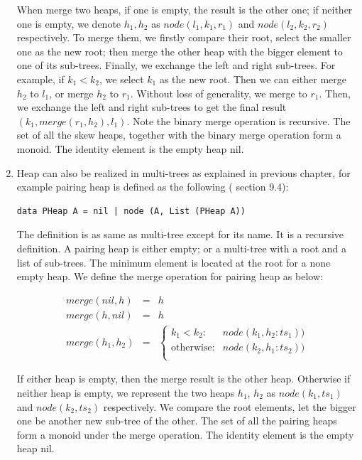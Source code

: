 \documentclass{article}
\begin{document}
\begin{enumerate}
When merge two heaps, if one is empty, the result is the other one; if neither one is empty, we denote $h_1, h_2$ as $node(l_1, k_1, r_1)$ and $node(l_2, k_2, r_2)$ respectively. To merge them, we firstly compare their root, select the smaller one as the new root; then merge the other heap with the bigger element to one of its sub-trees. Finally, we exchange the left and right sub-trees. For example, if $k_1 < k_2$, we select $k_1$ as the new root. Then we can either merge $h_2$ to $l_1$, or merge $h_2$ to $r_1$. Without loss of generality, we merge to $r_1$. Then, we exchange the left and right sub-trees to get the final result $(k_1, merge(r_1, h_2), l_1)$. Note the binary merge operation is recursive. The set of all the skew heaps, together with the binary merge operation form a monoid. The identity element is the empty heap nil.

\item Heap can also be realized in multi-trees as explained in previous chapter, for example pairing heap is defined as the following (\cite{LiuXinyu2017} section 9.4):

\begin{lstlisting}
data PHeap A = nil | node (A, List (PHeap A))
\end{lstlisting}

The definition is as same as multi-tree except for its name. It is a recursive definition. A pairing heap is either empty; or a multi-tree with a root and a list of sub-trees. The minimum element is located at the root for a none empty heap. We define the merge operation for pairing heap as below:

\[
\begin{array}{rcl}
merge(nil, h) & = & h \\
merge(h, nil) & = & h \\
merge(h_1, h_2) & = &
  \begin{cases}
  k_1 < k_2 : & node(k_1, h_2 : ts_1)) \\
  \text{otherwise} : & node(k_2, h_1 : ts_2)) \\
  \end{cases}
\end{array}
\]

If either heap is empty, then the merge result is the other heap. Otherwise if neither heap is empty, we represent the two heaps $h_1$, $h_2$ as $node(k_1, ts_1)$ and $node(k_2, ts_2)$ respectively. We compare the root elements, let the bigger one be another new sub-tree of the other. The set of all the pairing heaps form a monoid under the merge operation. The identity element is the empty heap nil.

\end{enumerate}
\end{document}

